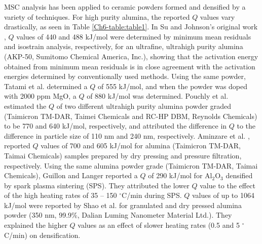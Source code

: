 MSC analysis has been applied to ceramic powders formed and densified by a variety of techniques. For high purity alumina, the reported $Q$ values vary drastically, as seen in Table \ref{Ch6-table:table1}. In Su and Johnson’s original work \cite{Su1996a}, $Q$ values of 440 and 488 kJ/mol were determined by minimum mean residuals and isostrain analysis, respectively, for an ultrafine, ultrahigh purity alumina (AKP-50, Sumitomo Chemical America, Inc.), showing that the activation energy obtained from minimum mean residuals is in close agreement with the activation energies determined by conventionally used methods. Using the same powder, Tatami et al. \cite{Tatami2006} determined a $Q$ of 555 kJ/mol, and when the powder was doped with 2000 ppm MgO, a $Q$ of 880 kJ/mol was determined. Pouchly et al. \cite{Pouchly2009} estimated the $Q$ of two different ultrahigh purity alumina powder graded (Taimicron TM-DAR, Taimei Chemicals and RC-HP DBM, Reynolds Chemicals) to be 770 and 640 kJ/mol, respectively, and attributed the difference in $Q$ to the difference in particle size of 110 nm and 240 nm, respectively. Aminzare et al. \cite{Aminzare2010}, reported $Q$ values of 700 and 605 kJ/mol for alumina (Taimicron TM-DAR, Taimai Chemicals) samples prepared by dry pressing and pressure filtration, respectively. Using the same alumina powder grade (Taimicron TM-DAR, Taimai Chemicals), Guillon and Langer \cite{Guillon2010} reported a $Q$ of 290 kJ/mol for Al$_{2}$O$_{3}$ densified by spark plasma sintering (SPS). They attributed the lower $Q$ value to the effect of the high heating rates of 35 – 150 $^{\circ}$C/min during SPS. $Q$ values of up to 1064 kJ/mol were reported by Shao et al. \cite{Shao2009} for granulated and dry pressed alumina powder (350 nm, 99.9\%, Dalian Luming Nanometer Material Ltd.). They explained the higher $Q$ values as an effect of slower heating rates (0.5 and 5 $^{\circ}$C/min) on densification.

